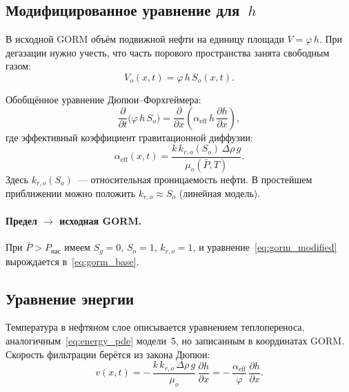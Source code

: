 \documentclass[12pt,a4paper]{article}
\begin{document}
\subsection{Модифицированное уравнение для~$h$}

В исходной GORM объём подвижной нефти на единицу площади
$V = \varphi\,h$. При дегазации нужно учесть, что часть порового
пространства занята свободным газом:
\begin{equation}\label{eq:gorm_V}
  V_o(x,t) = \varphi\,h\,S_o(x,t).
\end{equation}

Обобщённое уравнение Дюпюи--Форхгеймера:
\begin{equation}\label{eq:gorm_modified}
  \boxed{\;
    \frac{\partial}{\partial t}\bigl(\varphi\,h\,S_o\bigr)
    = \frac{\partial}{\partial x}
      \left(\alpha_{\mathrm{eff}}\,h\,
      \frac{\partial h}{\partial x}\right),
  \;}
\end{equation}
где эффективный коэффициент гравитационной диффузии:
\begin{equation}\label{eq:alpha_eff_gorm}
  \alpha_{\mathrm{eff}}(x,t)
    = \frac{k\,k_{r,o}(S_o)\,\Delta\rho\,g}{\mu_o(\bar{P},T)}.
\end{equation}
Здесь $k_{r,o}(S_o)$~--- относительная проницаемость нефти. В простейшем
приближении можно положить $k_{r,o} \approx S_o$ (линейная модель).

\paragraph{Предел $\to$ исходная GORM.}
При $\bar{P} > P_{\text{нас}}$ имеем $S_g = 0$, $S_o = 1$,
$k_{r,o} = 1$, и уравнение~\eqref{eq:gorm_modified} вырождается
в~\eqref{eq:gorm_base}.

\subsection{Уравнение энергии}

Температура в нефтяном слое описывается уравнением теплопереноса,
аналогичным~\eqref{eq:energy_pde} модели~5, но записанным в
координатах GORM. Скорость фильтрации берётся из закона Дюпюи:
\begin{equation}\label{eq:gorm_velocity}
  v(x,t) = -\,\frac{k\,k_{r,o}\,\Delta\rho\,g}{\mu_o}\,
            \frac{\partial h}{\partial x}
          = -\,\frac{\alpha_{\mathrm{eff}}}{\varphi}\,
            \frac{\partial h}{\partial x}.
\end{equation}
\end{document}
